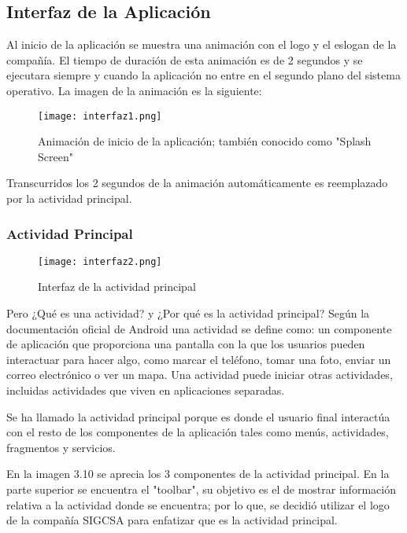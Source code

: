 \subsection{Interfaz de la Aplicación}

\par
Al inicio de la aplicación se muestra una animación con el logo y el eslogan de la compañía. El tiempo de duración de esta animación es de 2 segundos y se ejecutara siempre y cuando la aplicación no entre en el segundo plano del sistema operativo. La imagen de la animación es la siguiente:

\begin{figure}[H]
	\centering
	\texttt{[image: interfaz1.png]}
	\caption{Animación de inicio de la aplicación; también conocido como "Splash Screen"}
\end{figure}

\par \noindent
Transcurridos los 2 segundos de la animación automáticamente es reemplazado por la actividad principal.  

\subsubsection{Actividad Principal}

\begin{figure}[H]
	\centering
	\texttt{[image: interfaz2.png]}
	\caption{Interfaz de la actividad principal}
\end{figure}

\par 
Pero ¿Qué es una actividad? y ¿Por qué es la actividad principal? Según la documentación oficial de Android una actividad se define como: un componente de aplicación que proporciona una pantalla con la que los usuarios pueden interactuar para hacer algo, como marcar el teléfono, tomar una foto, enviar un correo electrónico o ver un mapa. Una actividad puede iniciar otras actividades, incluidas actividades que viven en aplicaciones separadas.\cite{androidapp}

\par \noindent
Se ha llamado la actividad principal porque es donde el usuario final interactúa con el resto de los componentes de la aplicación tales como menús, actividades, fragmentos y servicios. 

\par \noindent
En la imagen 3.10 se aprecia los 3 componentes de la actividad principal. En la parte superior se encuentra el "toolbar", su objetivo es el de mostrar información relativa a la actividad donde se encuentra; por lo que, se decidió utilizar el logo de la compañía SIGCSA para enfatizar que es la actividad principal. 

